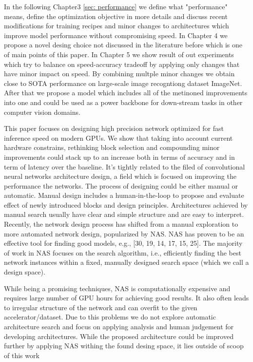 In the following Chapter3 \ref{sec: performance} we define what "performance" means, define the optimization objective in more details and discuss recent modifications for training recipes and minor changes to architectures which improve model performance without compromising speed. In Chapter 4 we propose a novel desing choice not discussed in the literature before which is one of main points of this paper. In Chapter 5 we show result of out experiments which try to balance on speed-accuracy tradeoff by applying only changes that have minor impact on speed. By combining multple minor changes we obtain close to SOTA performance on large-scale image recogntiong dataset ImageNet. After that we propose a model which includes all of the metinoned improvements into one and could be used as a power backbone for down-stream tasks in other computer vision domains.

This paper focuses on designing high precision network optimized for fast inference speed on modern GPUs. We show that taking into account current hardware constrains, rethinking block selection and compounding minor improvements could stack up to an increase both in terms of accuracy and in term of latency over the baseline. It's tightly related to the filed of convolutional neural networks architecture design, a field which is focused on improving the performance the networks. The process of designing could be either manual or automatic. Manual design includes a human-in-the-loop to propose and evaluate effect of newly introduced blocks and design principles. Architectures achieved by manual search usually have clear and simple structure and are easy to interpret. 
Recently, the network design process has shifted from a manual exploration to more automated network design, popularized by NAS. NAS has proven to be an effective tool for finding good models, e.g., [30, 19, 14, 17, 15, 25]. The majority of work in NAS focuses on the search algorithm, i.e., efficiently finding the best network instances within a fixed, manually designed search space (which we call a design space). 

While being a promising techniques, NAS is computationally expensive and requires large number of GPU hours for achieving good results. It also often leads to irregular structure of the network and can overfit to the given accelerator/dataset. Due to this problems we do not explore automatic architecture search and focus on applying analysis and human judgement for developing architectures. While the proposed architecture could be improved further by applying NAS withing the found desing space, it lies outside of scoop of this work




